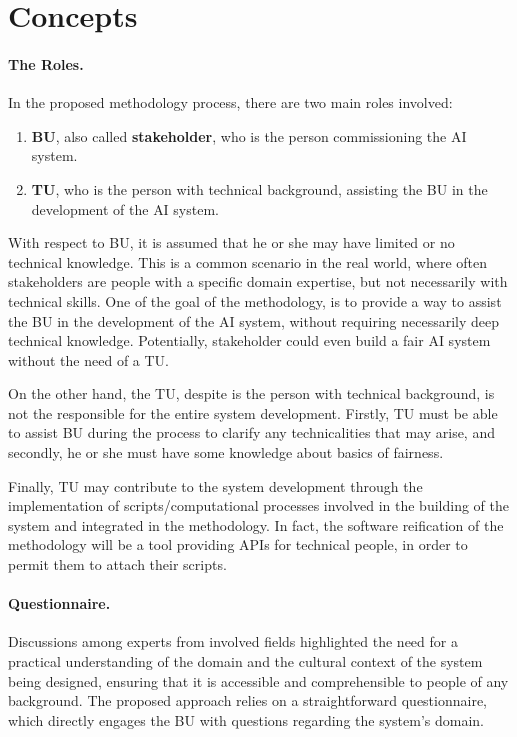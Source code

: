 \documentclass[12pt,a4paper,openright,twoside]{book}
\begin{document}
\section{Concepts}

\paragraph{The Roles.}
In the proposed methodology process, there are two main roles involved:
\begin{enumerate}
    \item \textbf{\ac{BU}}, also called \textbf{stakeholder}, who is the person commissioning the \ac{AI} system.
    \item \textbf{\ac{TU}}, who is the person with technical background, assisting the \ac{BU} in the development of the \ac{AI} system.
\end{enumerate}

With respect to \ac{BU}, it is assumed that he or she may have limited or no technical knowledge.
%
This is a common scenario in the real world, where often stakeholders are people with a specific domain expertise, but not necessarily with technical skills.
%
One of the goal of the methodology, is to provide a way to assist the \ac{BU} in the development of the \ac{AI} system, without requiring necessarily deep technical knowledge.
%
Potentially, stakeholder could even build a fair \ac{AI} system without the need of a \ac{TU}.

On the other hand, the \acl{TU}, despite is the person with technical background, is not the responsible for the entire system development.
%
Firstly, \ac{TU} must be able to assist \ac{BU} during the process to clarify any technicalities that may arise, and secondly, he or she must have some knowledge about basics of fairness.

Finally, \ac{TU} may contribute to the system development through the implementation of scripts/computational processes involved in the building of the system and integrated in the methodology.
%
In fact, the software reification of the methodology will be a tool providing \acp{API} for technical people, in order to permit them to attach their scripts.


\paragraph{Questionnaire.}
Discussions among experts from involved fields highlighted the need for a practical understanding of the domain and the cultural context of the system being designed, ensuring that it is accessible and comprehensible to people of any background.
%
The proposed approach relies on a straightforward questionnaire, which directly engages the \acl{BU} with questions regarding the system's domain.
\end{document}
